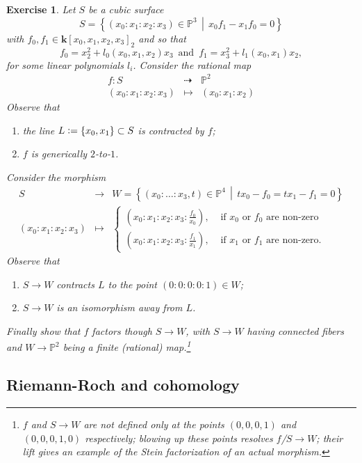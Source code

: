 \documentclass[a4paper,11pt]{amsart}
\newtheorem{exercise}[theorem]{Exercise}
\newcommand{\PP}{\mathbb{P}}
\newcommand{\kk}{\textbf{k}}
\newcommand{\defeq}{\vcentcolon=}
\newcommand{\rmap}{\dashrightarrow}
\begin{document}
\begin{exercise}
	Let $S$ be a cubic surface
	\[
	S  = \left\{(x_0:x_1:x_2:x_3) \in \PP^3\,\middle|\, x_0f_1 - x_1f_0 = 0 \right\}
	\]
	with $f_0, f_1\in \kk[x_0,x_1,x_2,x_3]_2$ and so that 
	\[
	f_0 = x_2^2 + l_0(x_0,x_1,x_2)x_3 \, \text{ and } \, f_1 = x_3^2 + l_1(x_0,x_1)x_2,
	\]
	for some linear polynomials $l_i$.
	Consider the rational map
	\[
	\begin{array}{ccc}
		f\colon S & \rmap & \PP^2\\
		(x_0:x_1:x_2:x_3) & \mapsto & (x_0:x_1:x_2)
	\end{array}
	\]
	Observe that
	\begin{enumerate}
		\item the line $L \defeq \{x_0,x_1\} \subset S$ is contracted by $f$;
		\item $f$ is generically $2$-to-$1$.
	\end{enumerate}
	
	Consider the morphism
	\[
	\begin{array}{ccc}
		S & \to & W = \left\{ (x_0:\ldots:x_3,t) \in \PP^4\,\middle|\, tx_0 - f_0 = tx_1-f_1 = 0 \right\}\\
		(x_0:x_1:x_2:x_3) & \mapsto & 
		\left\{
		\begin{array}{cl}
			\left( x_0:x_1:x_2:x_3:\frac{f_0}{x_0} \right), & \text{ if $x_0$ or $f_0$ are non-zero}\\
			\left( x_0:x_1:x_2:x_3:\frac{f_1}{x_1} \right),& \text{ if $x_1$ or $f_1$ are non-zero}.
		\end{array}
		\right.
	\end{array}
	\]
	Observe that
	\begin{enumerate}
		\item $S\to W$ contracts $L$ to the point $(0:0:0:0:1) \in W$;
		\item $S\to W$ is an isomorphism away from $L$.
	\end{enumerate}
	
	Finally show that $f$ factors though $S \to W$, with $S\to W$ having connected fibers and $W \to \PP^2$ being a finite (rational) map.\footnote{
	$f$ and $S \to W$ are  not defined only at the points $(0,0,0,1)$ and $(0,0,0,1,0)$ respectively;
	blowing up these points resolves $f$/$S \to W$;
	their lift gives an example of the Stein factorization of an \emph{actual} morphism.
	}
\end{exercise}

\subsection{Riemann-Roch and cohomology}\label{subsec:RRandCoh}
\end{document}
